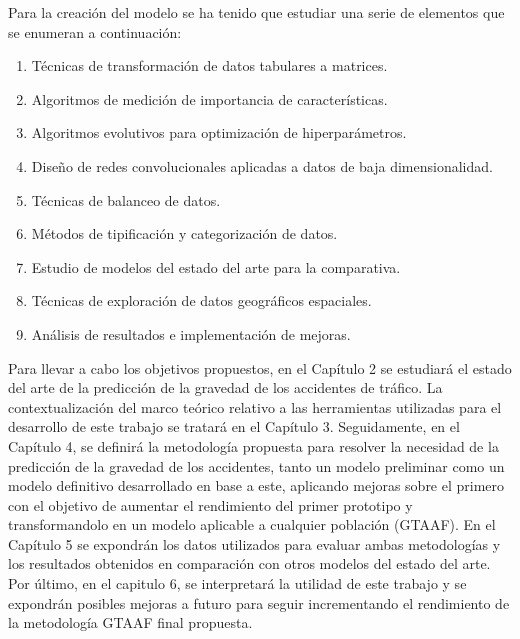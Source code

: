 \documentclass{uathesis-es}
\begin{document}

Para la creación del modelo se ha tenido que estudiar una serie de elementos que se enumeran a continuación:

\begin{enumerate}
    \item Técnicas de transformación de datos tabulares a matrices.
    \item Algoritmos de medición de importancia de características. 
    \item Algoritmos evolutivos para optimización de hiperparámetros.
    \item Diseño de redes convolucionales aplicadas a datos de baja dimensionalidad.
    \item Técnicas de balanceo de datos.
    \item Métodos de tipificación y categorización de datos.
    \item Estudio de modelos del estado del arte para la comparativa. 
    \item Técnicas de exploración de datos geográficos espaciales.
    \item Análisis de resultados e implementación de mejoras.
\end{enumerate}


Para llevar a cabo los objetivos propuestos, en el Capítulo 2 se estudiará el estado del arte de la predicción de la gravedad de los accidentes de tráfico. La contextualización del marco teórico relativo a las herramientas utilizadas para el desarrollo de este trabajo se tratará en el Capítulo 3. Seguidamente, en el Capítulo 4, se definirá la metodología propuesta para resolver la necesidad de la predicción de la gravedad de los accidentes, tanto un modelo preliminar como un modelo definitivo desarrollado en base a este, aplicando mejoras sobre el primero con el objetivo de aumentar el rendimiento del primer prototipo y transformandolo en un modelo aplicable a cualquier población (GTAAF). En el Capítulo 5 se expondrán los datos utilizados para evaluar ambas metodologías y los resultados obtenidos en comparación con otros modelos del estado del arte. Por último, en el capitulo 6, se interpretará la utilidad de este trabajo y se expondrán posibles mejoras a futuro para seguir incrementando el rendimiento de la metodología GTAAF final propuesta.
\end{document}

